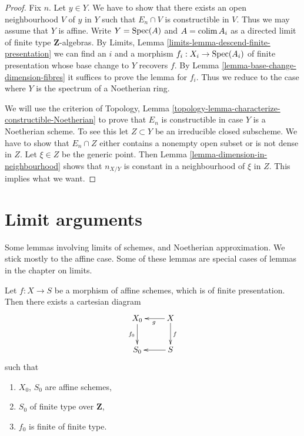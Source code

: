 \begin{proof}
Fix $n$. Let $y \in Y$. We have to show that there exists an open neighbourhood
$V$ of $y$ in $Y$ such that $E_n \cap V$ is constructible in $V$. Thus we may
assume that $Y$ is affine. Write $Y = \mathop{\rm Spec}(A)$ and
$A = \mathop{\rm colim}\nolimits A_i$ as a directed limit of finite type
$\mathbf{Z}$-algebras. By
Limits, Lemma \ref{limits-lemma-descend-finite-presentation}
we can find an $i$ and a morphism $f_i : X_i \to \mathop{\rm Spec}(A_i)$ of
finite presentation whose base change to $Y$ recovers $f$. By
Lemma \ref{lemma-base-change-dimension-fibres}
it suffices to prove the lemma for $f_i$. Thus we reduce to
the case where $Y$ is the spectrum of a Noetherian ring.

\medskip\noindent
We will use the criterion of
Topology, Lemma \ref{topology-lemma-characterize-constructible-Noetherian}
to prove that $E_n$ is constructible in case $Y$ is a Noetherian scheme.
To see this let $Z \subset Y$ be an irreducible closed subscheme.
We have to show that $E_n \cap Z$ either contains a nonempty open subset
or is not dense in $Z$. Let $\xi \in Z$ be the generic point. Then
Lemma \ref{lemma-dimension-in-neighbourhood}
shows that $n_{X/Y}$ is constant in a neighbourhood of $\xi$ in $Z$.
This implies what we want.
\end{proof}









\section{Limit arguments}
\label{section-limits}

\noindent
Some lemmas involving limits of schemes, and Noetherian approximation.
We stick mostly to the affine case. Some of these lemmas are special
cases of lemmas in the chapter on limits.

\begin{lemma}
\label{lemma-Noetherian-approximation}
Let $f : X \to S$ be a morphism of affine schemes, which is of finite
presentation. Then there exists a cartesian diagram
$$
\xymatrix{
X_0 \ar[d]_{f_0} & X \ar[l]^g \ar[d]^f \\
S_0 & S \ar[l]
}
$$
such that
\begin{enumerate}
\item $X_0$, $S_0$ are affine schemes,
\item $S_0$ of finite type over $\mathbf{Z}$,
\item $f_0$ is finite of finite type.
\end{enumerate}
\end{lemma}

